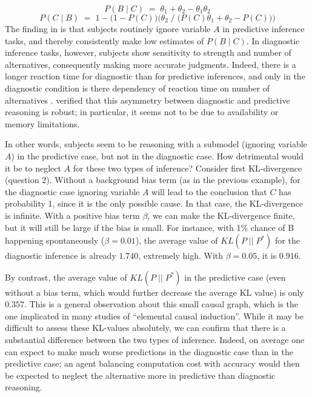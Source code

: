 \documentclass[10pt,letterpaper]{article}
\begin{document}
$$P(B\mid C) \;= \; \theta_1 + \theta_2 - \theta_1\theta_2$$
$$P(C \mid B) \;= \; 1- \big(1-P(C)\big)\Big(\theta_2\;/\;\big(P(C)\theta_1 + \theta_2  - P(C)\big)\Big)$$
The finding in \cite{Fernbach2011} is that subjects routinely ignore variable $A$ in predictive inference tasks, and thereby consistently make low estimates of $P(B\mid C)$. In diagnostic inference tasks, however, subjects show sensitivity to strength and number of alternatives, consequently making more accurate judgments. Indeed, there is a longer reaction time for diagnostic than for predictive inferences, and only in the diagnostic condition is there dependency of reaction time on number of alternatives \citep{Fernbach2010}. \cite{Fernbach2013} verified that this asymmetry between diagnostic and predictive reasoning is robust; in particular, it seems not to be due to availability or memory limitations.

In other words, subjects seem to be reasoning with a submodel (ignoring variable $A$) in the predictive case, but not in the diagnostic case. How detrimental would it be to neglect $A$ for these two types of inference? Consider first KL-divergence (question 2). Without a background bias term (as in the previous example), for the diagnostic case ignoring variable $A$ will lead to the conclusion that $C$ has probability 1, since it is the only possible cause. In that case, the KL-divergence is infinite. With a positive bias term $\beta$, we can make the KL-divergence finite, but it will still be large if the bias is small. For instance, with 1\% chance of B happening spontaneously ($\beta = 0.01$), the average value of $KL(P\;||\;P^*)$ for the diagnostic inference is already $1.740$, extremely high. With $\beta=0.05$, it is $0.916$.

By contrast, the average value of $KL(P\;||\;P^*)$ in the predictive case (even without a bias term, which would further decrease the average KL value) is only $0.357$.  
This is a general observation about this small causal graph, which is the one implicated in many studies of ``elemental causal induction''. 
While it may be difficult to assess these KL-values absolutely, we can confirm that there is a substantial difference between the two types of inference. Indeed, on average one can expect to make much worse predictions in the diagnostic case than in the predictive case; an agent balancing computation cost with accuracy would then be expected to neglect the alternative more in predictive than diagnostic reasoning.
\end{document}

